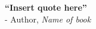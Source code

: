 \thispagestyle{empty}
\vspace*{\fill}
\begin{center}
	\begin{minipage}{1\textwidth}
		\raggedleft
		\textbf{“Insert quote here”}\\
		-
		Author, \textit{Name of book}
	\end{minipage}
\end{center}
\vfill %
\clearpage

